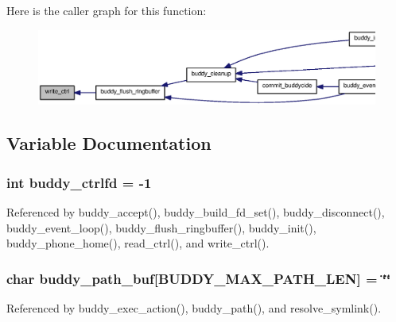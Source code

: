 Here is the caller graph for this function:\nopagebreak
\begin{figure}[H]
\begin{center}
\leavevmode
\includegraphics[width=400pt]{buddy_8c_a76b79c47442b30432c9f221b0b18c632_icgraph}
\end{center}
\end{figure}




\subsection{Variable Documentation}
\subsubsection[{buddy\_\-ctrlfd}]{\setlength{\rightskip}{0pt plus 5cm}int {\bf buddy\_\-ctrlfd} = -\/1\hspace{0.3cm}{\ttfamily  [static]}}\label{buddy_8c_a5d7cb1950bafb84d8b4d88b574640811}


Referenced by buddy\_\-accept(), buddy\_\-build\_\-fd\_\-set(), buddy\_\-disconnect(), buddy\_\-event\_\-loop(), buddy\_\-flush\_\-ringbuffer(), buddy\_\-init(), buddy\_\-phone\_\-home(), read\_\-ctrl(), and write\_\-ctrl().

\subsubsection[{buddy\_\-path\_\-buf}]{\setlength{\rightskip}{0pt plus 5cm}char {\bf buddy\_\-path\_\-buf}[BUDDY\_\-MAX\_\-PATH\_\-LEN] = \char`\"{}\char`\"{}\hspace{0.3cm}{\ttfamily  [static]}}\label{buddy_8c_a1eb224a393d00fd9a07b3a6c171e41bb}


Referenced by buddy\_\-exec\_\-action(), buddy\_\-path(), and resolve\_\-symlink().

